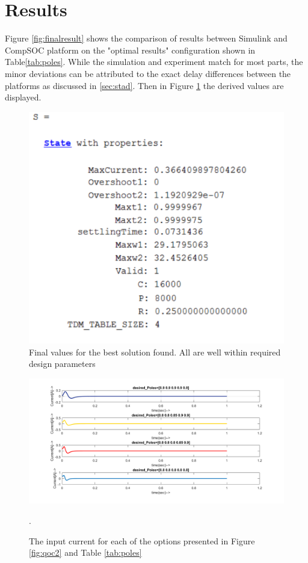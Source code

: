 
\section{Results}

Figure \ref{fig:finalresult} shows the comparison of results between Simulink and CompSOC platform on the "optimal results" configuration shown in Table\ref{tab:poles}. While the simulation and experiment match for most parts, the minor deviations can be attributed to the exact delay differences between the platforms as discussed in \ref{sec:stad}. Then in Figure \ref{fig:Sresult} the derived values are displayed.


\begin{figure}[h!]
	\begin{center}
		\includegraphics[width=0.5\linewidth]{img/S}
		\caption{Final values for the best solution found. All are well within required design parameters}
		\label{fig:Sresult}
	\end{center}
\end{figure}

\begin{figure}[h]
	\begin{center}
		\includegraphics[width=0.8\linewidth]{img/current}
		\caption{The input current for each of the options presented in Figure \ref{fig:qoc2} and Table \ref{tab:poles}}.
		\label{fig:current}
	\end{center}
\end{figure}

